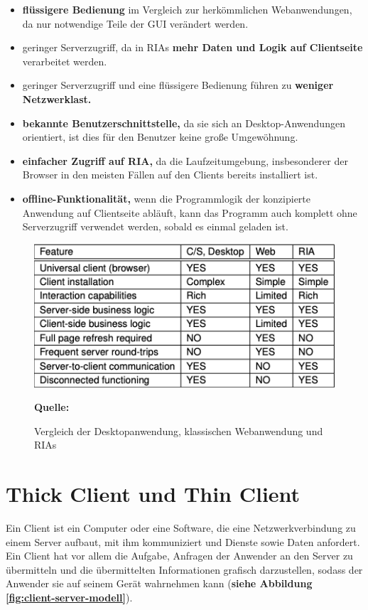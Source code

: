 \begin{itemize}
\item \textbf{flüssigere Bedienung} im Vergleich zur herkömmlichen Webanwendungen, da nur notwendige Teile der GUI verändert werden.
\item geringer Serverzugriff, da in RIAs \textbf{mehr Daten und Logik auf Clientseite} verarbeitet werden.
\item geringer Serverzugriff und eine flüssigere Bedienung führen zu \textbf{weniger Netzwerklast.}
\item \textbf{bekannte Benutzerschnittstelle,} da sie sich an Desktop-Anwendungen orientiert, ist dies für den Benutzer keine große Umgewöhnung.
\item \textbf{einfacher Zugriff auf RIA,} da die Laufzeitumgebung, insbesonderer der Browser in den meisten Fällen auf den Clients bereits installiert ist.
\item \textbf{offline-Funktionalität,} wenn die Programmlogik der konzipierte Anwendung auf Clientseite abläuft, kann das Programm auch komplett ohne Serverzugriff verwendet werden, sobald es einmal geladen ist. 
\end{itemize}

\begin{figure}[H]
  \begin{center}
    \includegraphics[scale=0.6]{img/desktop_web_ria_vergleich}
	\caption{Vergleich der Desktopanwendung, klassischen Webanwendung und RIAs}
	\footnotesize\sffamily\textbf{Quelle:} \cite{Boz2006}  
	\label{fig:ria}
  \end{center}   
\end{figure}

\section{Thick Client und Thin Client}
\label{sec:thick client und thin client}
Ein Client ist ein Computer oder eine Software, die eine Netzwerkverbindung zu einem Server aufbaut, mit ihm kommuniziert und Dienste sowie Daten anfordert. Ein Client hat vor allem die Aufgabe, Anfragen der Anwender an den Server zu übermitteln und die übermittelten Informationen grafisch darzustellen, sodass der Anwender sie auf seinem Gerät wahrnehmen kann (\textbf{siehe Abbildung \ref{fig:client-server-modell}}).\bigskip

